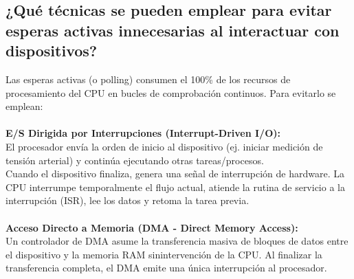 \documentclass[12pt, a4paper]{article}
\begin{document}
\subsection{¿Qué técnicas se pueden emplear para evitar esperas activas innecesarias al interactuar con dispositivos?}
    Las esperas activas (o polling) consumen el 100\% de los recursos de procesamiento del CPU en bucles de comprobación continuos. Para evitarlo se emplean:\\\\
    \textbf{E/S Dirigida por Interrupciones (Interrupt-Driven I/O):}\\
    El procesador envía la orden de inicio al dispositivo (ej. iniciar medición de tensión arterial) y continúa ejecutando otras tareas/procesos.\\
    Cuando el dispositivo finaliza, genera una señal de interrupción de hardware. La CPU interrumpe temporalmente el flujo actual, atiende la rutina de servicio a la interrupción (ISR), lee los datos y retoma la tarea previa.\\\\
    \textbf{Acceso Directo a Memoria (DMA - Direct Memory Access):}\\
    Un controlador de DMA asume la transferencia masiva de bloques de datos entre el dispositivo y la memoria RAM sinintervención de la CPU. Al finalizar la transferencia completa, el DMA emite una única interrupción al procesador.\\
\end{document}
